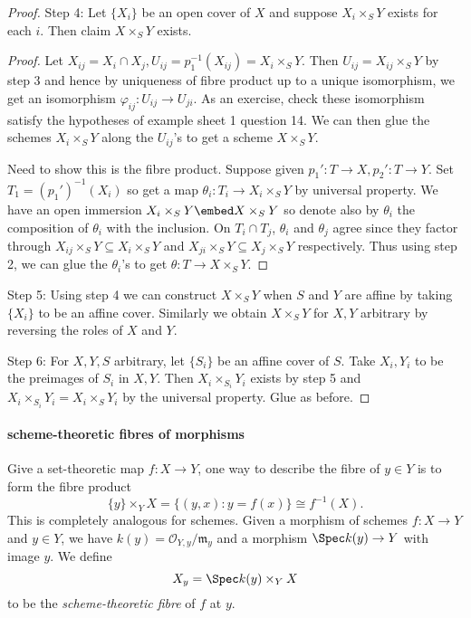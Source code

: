 \documentclass[a4paper]{article}
\newcommand{\sh}[1]{\mathcal{#1}} %
\begin{document}
\begin{proof}
  Step 4: Let \(\{X_i\}\) be an open cover of \(X\) and suppose \(X_i \times_S Y\) exists for each \(i\). Then claim \(X \times_S Y\) exists.
  \begin{proof}
    Let \(X_{ij} = X_i \cap X_j, U_{ij} = p_1^{-1}(X_{ij}) = X_i \times_S Y\). Then \(U_{ij} = X_{ij} \times_S Y\) by step 3 and hence by uniqueness of fibre product up to a unique isomorphism, we get an isomorphism \(\varphi_{ij}: U_{ij} \to U_{ji}\). As an exercise, check these isomorphism satisfy the hypotheses of example sheet 1 question 14. We can then glue the schemes \(X_i \times_S Y\) along the \(U_{ij}\)'s to get a scheme \(X \times_S Y\).

    Need to show this is the fibre product. Suppose given \(p_1': T \to X, p_2': T \to Y\). Set \(T_1 = (p_1')^{-1}(X_i)\) so get a map \(\theta_i: T_i \to X_i \times_S Y\) by universal property. We have an open immersion \(X_i \times_S Y \embed X \times_S Y\) so denote also by \(\theta_i\) the composition of \(\theta_i\) with the inclusion. On \(T_i \cap T_j\), \(\theta_i\) and \(\theta_j\) agree since they factor through \(X_{ij} \times_S Y \subseteq X_i \times_S Y\) and \(X_{ji} \times_S Y \subseteq X_j \times_S Y\) respectively. Thus using step 2, we can glue the \(\theta_i\)'s to get \(\theta: T \to X \times_S Y\).
  \end{proof}

  Step 5: Using step 4 we can construct \(X \times_S Y\) when \(S\) and \(Y\) are affine by taking \(\{X_i\}\) to be an affine cover. Similarly we obtain \(X \times_S Y\) for \(X, Y\) arbitrary by reversing the roles of \(X\) and \(Y\).

  Step 6: For \(X, Y, S\) arbitrary, let \(\{S_i\}\) be an affine cover of \(S\). Take \(X_i, Y_i\) to be the preimages of \(S_i\) in \(X, Y\). Then \(X_i \times_{S_i} Y_i\) exists by step 5 and \(X_i \times_{S_i} Y_i = X_i \times_S Y_i\) by the universal property. Glue as before.
\end{proof}

\paragraph{scheme-theoretic fibres of morphisms}

Give a set-theoretic map \(f: X \to Y\), one way to describe the fibre of \(y \in Y\) is to form the fibre product
\[
  \{y\} \times_Y X = \{(y, x): y = f(x)\} \cong f^{-1}(X).
\]
This is completely analogous for schemes. Given a morphism of schemes \(f: X \to Y\) and \(y \in Y\), we have \(k(y) = \sh O_{Y, y}/\mathfrak m_y\) and a morphism \(\Spec k(y) \to Y\) with image \(y\). We define
\[
  X_y = \Spec k(y) \times_Y X
\]
to be the \emph{scheme-theoretic fibre} of \(f\) at \(y\).
\end{document}
